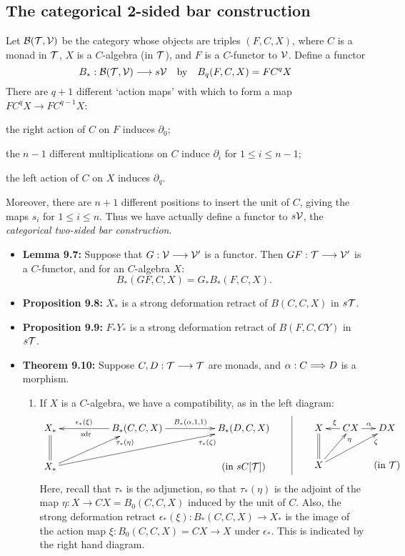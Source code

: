 \documentclass[11pt]{article}
\begin{document}
\begin{itemise}
\subsection*{The categorical 2-sided bar construction}
Let $\mathcal{B}(\mathcal{T},\mathcal{V})$ be the category whose objects are triples $(F,C,X)$, where $C$ is a monad in $\mathcal{T}$, $X$ is a $C$-algebra (in $\mathcal{T}$), and $F$ is a $C$-functor to $\mathcal{V}$. Define a functor
\[B_*:\mathcal{B}(\mathcal{T},\mathcal{V})\longrightarrow s\mathcal{V}\textup{\quad by\quad}B_q(F,C,X)=FC^qX\]
There are $q+1$ different `action maps' with which to form a map $FC^qX\to FC^{q-1}X$: 
\begin{itemise}
\item the right action of $C$ on $F$ induces $\partial_0$;
\item the $n-1$ different multiplications on $C$ induce $\partial_i$ for $1\leq i\leq n-1$;
\item the left action of $C$ on $X$ induces $\partial_q$.
\end{itemise}
Moreover, there are $n+1$ different positions to insert the unit of $C$, giving the maps $s_i$ for $1\leq i\leq n$. Thus we have actually define a functor to $s\mathcal{V}$, the \emph{categorical two-sided bar construction}.
\begin{itemize}\squishlist
\item \textbf{Lemma 9.7:} Suppose that $G:\mathcal{V}\longrightarrow\mathcal{V}'$ is a functor. Then $GF:\mathcal{T}\longrightarrow\mathcal{V}'$ is a $C$-functor, and for an $C$-algebra $X$:
\[B_*(GF,C,X)=G_*B_*(F,C,X).\]
\item \textbf{Proposition 9.8:} $X_*$ is a strong deformation retract of $B(C,C,X)$ in $s\mathcal{T}$.
\item \textbf{Proposition 9.9:} $F_*Y_*$ is a strong deformation retract of $B(F,C,CY)$ in $s\mathcal{T}$.
\item \textbf{Theorem 9.10:} 
Suppose $C,D:\mathcal{T}\longrightarrow\mathcal{T}$ are monads, and  $\alpha:C\Longrightarrow D$ is a morphism.
\begin{enumerate}\squishlist
\item If $X$ is a $C$-algebra, we have a compatibility, as in the left diagram:
\[\xymatrix@C=1.8cm{
\ar@{=}[d]X_*&\ar[l]_{\epsilon_*(\xi)\qquad}^{\textup{sdr\qquad}}
B_*(C,C,X)\ar[r]^{B_*(\alpha,1,1)}
&B_*(D,C,X)\\
X_*\ar[ur]_(.8){\tau_*(\eta)}\ar[urr]_(.8){\tau_*(\zeta)}&
&\makebox[0cm][c]{(in $sC[\calT]$)}
}\qquad\vrule\qquad\xymatrix@C=.5cm{
X\ar@{=}[d]&\ar[l]_{\xi}CX\ar[r]^\alpha&DX\\
X\ar[ur]_(.8){\eta}\ar[urr]_(.8){\zeta}&&\makebox[0cm][c]{(in $\calT$)}
}\]
Here, recall that $\tau_*$ is the adjunction, so that $\tau_*(\eta)$ is the adjoint of the map $\eta:X\to CX=B_0(C,C,X)$ induced by the unit of $C$. Also, the strong deformation retract $\epsilon_*(\xi):B_*(C,C,X)\to X_*$ is the image of the action map $\xi:B_0(C,C,X)=CX\to X$ under $\epsilon_*$. This is indicated by the right hand diagram.

\end{enumerate}
\end{itemize}
\end{itemise}
\end{document}

